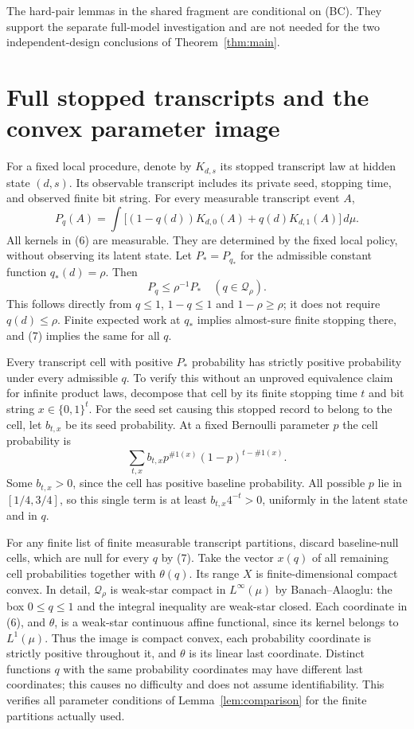 \documentclass[11pt]{article}
\begin{document}


The hard-pair lemmas in the shared fragment are conditional on (BC).
They support the separate full-model investigation and are not needed for
the two independent-design conclusions of Theorem~\ref{thm:main}.

\section{Full stopped transcripts and the convex parameter image}
For a fixed local procedure, denote by $K_{d,s}$ its stopped transcript law
at hidden state $(d,s)$. Its observable transcript includes its private
seed, stopping time, and observed finite bit string. For every measurable
transcript event $A$,
\[
 P_q(A)=\int\big[(1-q(d))K_{d,0}(A)+q(d)K_{d,1}(A)\big]\,d\mu. \tag{6}
\]
All kernels in (6) are measurable. They are determined by the fixed local
policy, without observing its latent state. Let $P_*=P_{q_*}$ for the
admissible constant function $q_*(d)=\rho$. Then
\[
                 P_q\le\rho^{-1}P_* \quad(q\in\mathcal Q_\rho). \tag{7}
\]
This follows directly from $q\le1$, $1-q\le1$ and $1-\rho\ge\rho$;
it does not require $q(d)\le\rho$. Finite expected work at $q_*$ implies
almost-sure finite stopping there, and (7) implies the same for all $q$.

Every transcript cell with positive $P_*$ probability has strictly positive
probability under every admissible $q$. To verify this without an
unproved equivalence claim for infinite product laws, decompose that cell
by its finite stopping time $t$ and bit string $x\in\{0,1\}^t$.
For the seed set causing this stopped record to belong to the cell, let
$b_{t,x}$ be its seed probability. At a fixed Bernoulli parameter $p$ the
cell probability is
\[
 \sum_{t,x} b_{t,x}p^{\#1(x)}(1-p)^{t-\#1(x)}.
\]
Some $b_{t,x}>0$, since the cell has positive baseline probability.
All possible $p$ lie in $[1/4,3/4]$, so this single term is at least
$b_{t,x}4^{-t}>0$, uniformly in the latent state and in $q$.

For any finite list of finite measurable transcript partitions, discard
baseline-null cells, which are null for every $q$ by (7). Take the vector
$x(q)$ of all remaining cell probabilities together with $\theta(q)$.
Its range $X$ is finite-dimensional compact convex. In detail,
$\mathcal Q_\rho$ is weak-star compact in $L^\infty(\mu)$ by
Banach--Alaoglu: the box $0\le q\le1$ and the integral inequality are
weak-star closed. Each coordinate in (6), and $\theta$, is a weak-star
continuous affine functional, since its kernel belongs to $L^1(\mu)$.
Thus the image is compact convex, each probability coordinate is strictly
positive throughout it, and $\theta$ is its linear last coordinate.
Distinct functions $q$ with the same probability coordinates may have
different last coordinates; this causes no difficulty and does not assume
identifiability. This verifies all parameter conditions of
Lemma~\ref{lem:comparison} for the finite partitions actually used.
\end{document}
